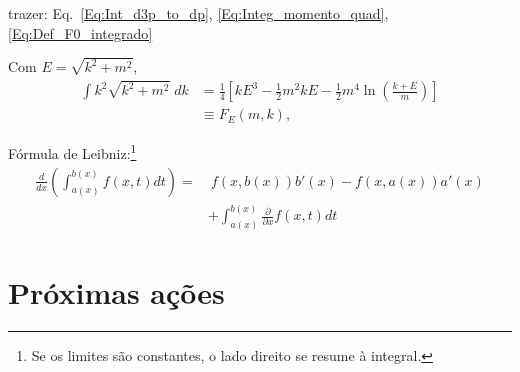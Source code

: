 trazer: Eq.~\ref{Eq:Int_d3p_to_dp}, \eqref{Eq:Integ_momento_quad}, \eqref{Eq:Def_F0_integrado}

Com $E = \sqrt{k^2 + m^2}$, 
\begin{align} \label{Eq:Def_F_E}
	\int k^2 \sqrt{k^2 + m^2} \;dk &= \frac{1}{4}\left[k E^3 - \frac{1}{2} m^2 k E - \frac{1}{2} m^4\ln\left(\frac{k+E}{m}\right)\right] \\
	&\equiv F_E(m, k),
\end{align}

Fórmula de Leibniz:\footnote{Se os limites são constantes, o lado direito se resume à integral.}
\begin{equation}\label{Eq:Form_Leibniz}
\begin{split}
	\frac{d}{dx} \left(\int_{a(x)}^{b(x)} f(x,t) dt\right) =&~ f(x, b(x))b'(x) - f(x, a(x))a'(x) \\
	&+ \int_{a(x)}^{b(x)}\frac{\partial}{\partial x}f(x,t) dt
\end{split}
\end{equation}

\section{Próximas ações}

